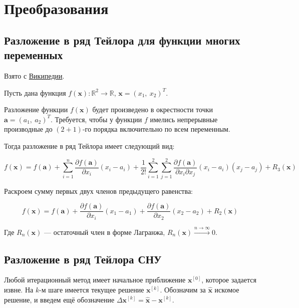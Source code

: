 \documentclass[12pt, a4paper]{article}
\begin{document}
\section{Преобразования}

\subsection{Разложение в ряд Тейлора для функции многих переменных}

Взято с \href{https://ru.wikipedia.org/wiki/%D0%A0%D1%8F%D0%B4_%D0%A2%D0%B5%D0%B9%D0%BB%D0%BE%D1%80%D0%B0#%D0%A4%D0%BE%D1%80%D0%BC%D1%83%D0%BB%D0%B0_%D0%A2%D0%B5%D0%B9%D0%BB%D0%BE%D1%80%D0%B0_%D0%B4%D0%BB%D1%8F_%D1%84%D1%83%D0%BD%D0%BA%D1%86%D0%B8%D0%B8_%D0%B4%D0%B2%D1%83%D1%85_%D0%BF%D0%B5%D1%80%D0%B5%D0%BC%D0%B5%D0%BD%D0%BD%D1%8B%D1%85}{Википедии}.

Пусть дана функция $f(\mathbf{x}) : \mathbb{R}^2 \to \mathbb{R}$, $\mathbf{x} = (x_1,\ x_2)^T$.

Разложение функции $f(\mathbf{x})$ будет произведено в окрестности точки $\mathbf{a} = (a_1,\ a_2)^T$. Требуется, чтобы у функции $f$ имелись непрерывные производные до $(2+1)$-го порядка включительно по всем переменным.

Тогда разложение в ряд Тейлора имеет следующий вид:

$$ f(\mathbf{x}) = f(\mathbf{a}) + \sum_{i = 1}^n \frac{\partial f(\mathbf{a})}{\partial x_i} (x_i - a_i) + \frac{1}{2!} \sum_{i = 1}^2\sum_{j = 1}^2 \frac{\partial f(\mathbf{a})}{\partial x_i \partial x_j} (x_i - a_i) (x_j - a_j) + R_3(\mathbf{x}) $$

Раскроем сумму первых двух членов предыдущего равенства:

$$ f(\mathbf{x}) = f(\mathbf{a}) + \frac{\partial f(\mathbf{a})}{\partial x_i} (x_1 - a_1) + \frac{\partial f(\mathbf{a})}{\partial x_2} (x_2 - a_2) + R_2(\mathbf{x}) $$

Где $R_n(\mathbf{x})$ --- остаточный член в форме Лагранжа, $ R_n(\mathbf{x}) \xrightarrow{n\to \infty} 0 $.

\subsection{Разложение в ряд Тейлора СНУ}

Любой итерационный метод имеет начальное приближение $\mathbf{x}^{[0]}$, которое задается извне. На $k$-м шаге имеется текущее решение $\mathbf{x}^{[k]}$. Обозначим за $\hat{\mathbf{x}}$ искомое решение, и введем ещё обозначение $\Delta\mathbf{x}^{[k]} = \hat{\mathbf{x}} - \mathbf{x}^{[k]}$.
\end{document}
